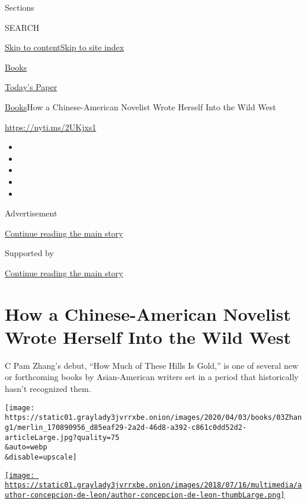 Sections

SEARCH

\protect\hyperlink{site-content}{Skip to
content}\protect\hyperlink{site-index}{Skip to site index}

\href{https://www.nytimes3xbfgragh.onion/section/books}{Books}

\href{https://myaccount.nytimes3xbfgragh.onion/auth/login?response_type=cookie\&client_id=vi}{}

\href{https://www.nytimes3xbfgragh.onion/section/todayspaper}{Today's
Paper}

\href{/section/books}{Books}\textbar{}How a Chinese-American Novelist
Wrote Herself Into the Wild West

\url{https://nyti.ms/2UKjxs1}

\begin{itemize}
\item
\item
\item
\item
\item
\end{itemize}

Advertisement

\protect\hyperlink{after-top}{Continue reading the main story}

Supported by

\protect\hyperlink{after-sponsor}{Continue reading the main story}

\hypertarget{how-a-chinese-american-novelist-wrote-herself-into-the-wild-west}{%
\section{How a Chinese-American Novelist Wrote Herself Into the Wild
West}\label{how-a-chinese-american-novelist-wrote-herself-into-the-wild-west}}

C Pam Zhang's debut, ``How Much of These Hills Is Gold,'' is one of
several new or forthcoming books by Asian-American writers set in a
period that historically hasn't recognized them.

\texttt{[image: https://static01.graylady3jvrrxbe.onion/images/2020/04/03/books/03Zhang1/merlin\_170890956\_d85eaf29-2a2d-46d8-a392-c861c0dd52d2-articleLarge.jpg?quality=75\\\&auto=webp\\\&disable=upscale]}

\href{https://www.nytimes3xbfgragh.onion/by/concepcion-de-leon}{\texttt{[image: https://static01.graylady3jvrrxbe.onion/images/2018/07/16/multimedia/author-concepcion-de-leon/author-concepcion-de-leon-thumbLarge.png]}}

